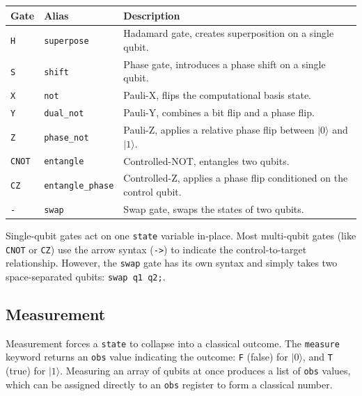 \begin{center}
\begin{tabular}{|l|l|p{9cm}|}
\hline
\textbf{Gate} & \textbf{Alias} & \textbf{Description} \\
\hline
\texttt{H}    & \texttt{superpose}       & Hadamard gate, creates superposition on a single qubit. \\
\texttt{S}    & \texttt{shift}           & Phase gate, introduces a phase shift on a single qubit. \\
\texttt{X}    & \texttt{not}             & Pauli-X, flips the computational basis state. \\
\texttt{Y}    & \texttt{dual\_not}       & Pauli-Y, combines a bit flip and a phase flip. \\
\texttt{Z}    & \texttt{phase\_not}      & Pauli-Z, applies a relative phase flip between $|0\rangle$ and $|1\rangle$. \\
\texttt{CNOT} & \texttt{entangle}        & Controlled-NOT, entangles two qubits. \\
\texttt{CZ}   & \texttt{entangle\_phase} & Controlled-Z, applies a phase flip conditioned on the control qubit. \\
\texttt{-} & \texttt{swap}           & Swap gate, swaps the states of two qubits. \\
\hline
\end{tabular}
\end{center}

Single-qubit gates act on one \texttt{state} variable in-place. Most multi-qubit gates (like \texttt{CNOT} or \texttt{CZ}) use the arrow syntax (\texttt{->}) to indicate the control-to-target relationship. However, the \texttt{swap} gate has its own syntax and simply takes two space-separated qubits: \texttt{swap q1 q2;}.

\subsection{Measurement}
\label{sec:measurement}

Measurement forces a \texttt{state} to collapse into a classical outcome.
The \texttt{measure} keyword returns an \texttt{obs} value indicating the outcome:
\texttt{F} (false) for $|0\rangle$, and \texttt{T} (true) for $|1\rangle$.
Measuring an array of qubits at once produces a list of \texttt{obs} values,
which can be assigned directly to an \texttt{obs} register to form a classical number.

